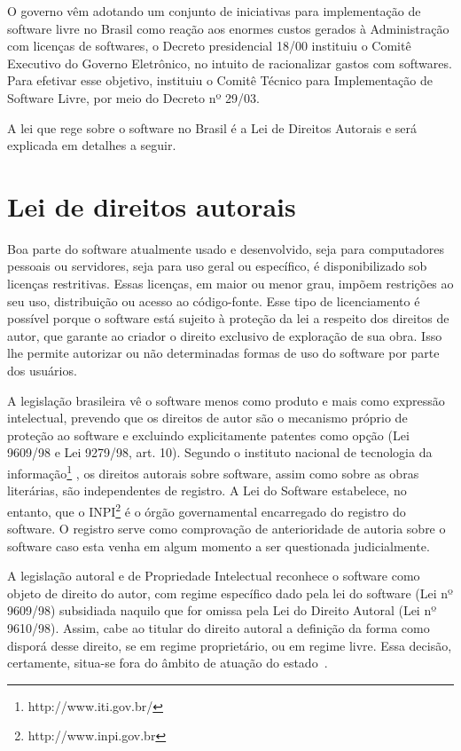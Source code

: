 O governo vêm adotando um conjunto de iniciativas para implementação de software
livre no Brasil como reação aos enormes custos gerados à Administração com licenças
de softwares, o Decreto presidencial 18/00 instituiu o Comitê Executivo do Governo
Eletrônico, no intuito de racionalizar gastos com softwares. Para efetivar esse 
objetivo, instituiu o Comitê Técnico para Implementação de Software Livre, por
meio do Decreto nº 29/03. 

A lei que rege sobre o software no Brasil é a Lei de Direitos Autorais e será 
explicada em detalhes a seguir. 


\section{Lei de direitos autorais}

Boa parte do software atualmente usado e desenvolvido, seja para computadores 
pessoais ou servidores, seja para uso geral ou específico, é disponibilizado sob
licenças restritivas. Essas licenças, em maior ou menor grau, impõem restrições 
ao seu uso, distribuição ou acesso ao código-fonte. Esse tipo de licenciamento é 
possível porque o software está sujeito à proteção da lei a respeito dos direitos 
de autor, que garante ao criador o direito exclusivo de exploração de sua obra. 
Isso lhe permite autorizar ou não determinadas formas de uso do software por parte 
dos usuários.%

A legislação brasileira vê o software menos como produto e mais como expressão 
intelectual, prevendo que os direitos de autor são o mecanismo próprio de proteção 
ao software e excluindo explicitamente patentes como opção (Lei 9609/98 e Lei 9279/98, art. 10).
%
Segundo o instituto nacional de tecnologia da informação\footnote{http://www.iti.gov.br/}
, os direitos autorais sobre software, assim como sobre as obras literárias, são 
independentes de registro. A Lei do Software estabelece, no entanto, que o INPI\footnote{http://www.inpi.gov.br}
é o órgão governamental encarregado do registro do software. O registro serve 
como comprovação de anterioridade de autoria sobre o software caso esta venha 
em algum momento a ser questionada judicialmente.

A legislação autoral e de Propriedade Intelectual reconhece o software como objeto 
de direito do autor, com regime específico dado pela lei do software (Lei nº 9609/98)
subsidiada naquilo que for omissa pela Lei do Direito Autoral (Lei nº 9610/98).
%
Assim, cabe ao titular do direito autoral a definição da forma como disporá desse
direito, se em regime proprietário, ou em regime livre. Essa decisão, certamente,
situa-se fora do âmbito de atuação do estado~\cite{junior2005software}.

